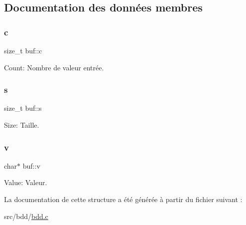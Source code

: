 \subsection{Documentation des données membres}
\mbox{\label{structbuf_a37cf76bb775bf17b3e7566e0611428e6}} 
\subsubsection{\texorpdfstring{c}{c}}
{\footnotesize\ttfamily size\+\_\+t buf\+::c}



Count\+: Nombre de valeur entrée. 

\mbox{\label{structbuf_aae0f7f61347b29fa0088cbf7d952b14c}} 
\subsubsection{\texorpdfstring{s}{s}}
{\footnotesize\ttfamily size\+\_\+t buf\+::s}



Size\+: Taille. 

\mbox{\label{structbuf_a0690d33ca270683cb07fd9a1b9f4dd68}} 
\subsubsection{\texorpdfstring{v}{v}}
{\footnotesize\ttfamily char$\ast$ buf\+::v}



Value\+: Valeur. 



La documentation de cette structure a été générée à partir du fichier suivant \+:\begin{DoxyCompactItemize}
\item 
src/bdd/\hyperlink{bdd_8c}{bdd.\+c}\end{DoxyCompactItemize}
